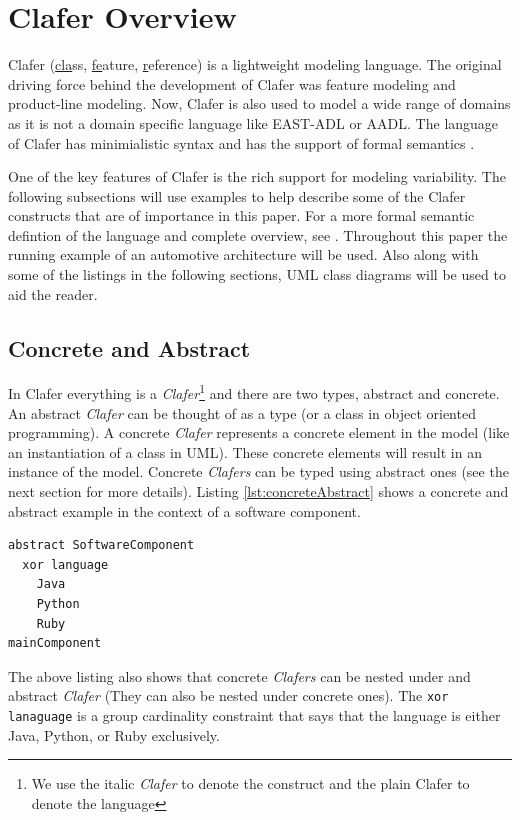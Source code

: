 \documentclass[10pt,oneside]{IEEEtran}
\begin{document}
\section{Clafer Overview}
Clafer (\underline{cla}ss, \underline{fe}ature, \underline{r}eference) is a lightweight modeling language.
The original driving force behind the development of Clafer was feature modeling and product-line modeling.
Now, Clafer is also used to model a wide range of domains as it is not a domain specific language like EAST-ADL
or AADL. The language of Clafer has minimialistic syntax and has the support of
formal semantics \cite{9}.

One of the key features of Clafer is the rich support for modeling variability. The following subsections
will use examples to help describe some of the Clafer constructs that are of importance in this paper.
For a more formal semantic defintion of the language and complete overview, see \cite{10}.
Throughout this paper the running example of an automotive architecture will be used. Also along with some of the listings in the following sections, UML class diagrams will be used to aid the reader.

\subsection{Concrete and Abstract}
In Clafer everything is a \textit{Clafer}\footnote{We use the italic \textit{Clafer} to denote the construct
and the plain Clafer to denote the language} and there are two types, abstract and concrete. An abstract
\textit{Clafer} can be thought of as a type (or a class in object oriented programming). A concrete
\textit{Clafer} represents a concrete element in the model (like an instantiation of a class in UML). These concrete elements will result in an
instance of the model. Concrete \textit{Clafers} can be typed using abstract ones (see the next section
for more details). Listing \ref{lst:concreteAbstract} shows a concrete and abstract example in the
context of a software component.

\begin{lstlisting}[label={lst:concreteAbstract},caption={Example of abstract and concrete \textit{Clafers}}]
abstract SoftwareComponent
  xor language
    Java
    Python
    Ruby
mainComponent
\end{lstlisting}

The above listing also shows that concrete \textit{Clafers} can be nested under and abstract \textit{Clafer} (They can also be nested under concrete ones). The \lstinline$xor lanaguage$ is a group cardinality constraint that says that the language is either Java, Python, or Ruby exclusively.
\end{document}

